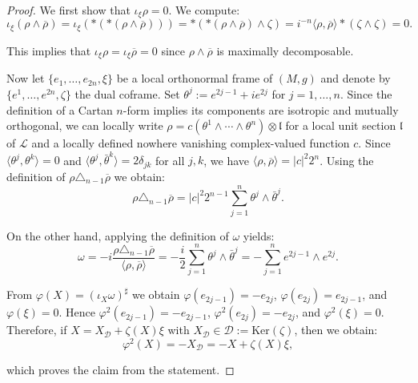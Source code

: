 \documentclass[10pt,a4paper,twoside,reqno]{amsart}
\theoremstyle{plain}
\theoremstyle{definition}
\theoremstyle{remark}
\newcommand{\escal}[1]{\langle#1\rangle}
\renewcommand{\ker}{\mathrm{Ker}}
\begin{document}
\begin{proof}
We first show that $\iota_\xi\rho=0$. We compute:
\begin{equation}\label{eq:contraccion-xi}
\iota_\xi(\rho\wedge\overline{\rho})=\iota_\xi(*(*(\rho\wedge\overline{\rho})))=*(*(\rho\wedge\overline{\rho})\wedge\zeta)=i^{-n}\escal{\rho,\overline{\rho}}*(\zeta\wedge\zeta)=0.
\end{equation}

\noindent
This implies that $\iota_\xi\rho=\iota_\xi\overline{\rho}=0$ since $\rho\wedge\overline{\rho}$ is maximally decomposable.\medskip

Now let $\{e_1,\ldots,e_{2n},\xi\}$ be a local orthonormal frame of $(M,g)$ and denote by $\{e^1,\ldots,e^{2n},\zeta\}$ the dual coframe. Set $\theta^j:=e^{2j-1}+ie^{2j}$ for $j=1,\ldots,n$. Since the definition of a Cartan $n$-form implies its components are isotropic and mutually orthogonal, we can locally write $\rho=c(\theta^1 \wedge \cdots \wedge \theta^n)\otimes\mathfrak{l}$ for a local unit section $\mathfrak{l}$ of $\mathcal{L}$ and a locally defined nowhere vanishing complex-valued function $c$. Since $\escal{\theta^j,\theta^k}=0$ and $\escal{\theta^j,\bar{\theta}^k}=2\delta_{jk}$ for all $j,k$, we have $\escal{\rho,\overline{\rho}}=|c|^2 2^n$. Using the definition of $\rho \triangle_{n-1}\overline{\rho}$ we obtain:
\begin{equation*}
\rho\triangle_{n-1}\overline{\rho}=|c|^2 2^{n-1}\sum_{j=1}^n\theta^j\wedge\bar{\theta}^j.
\end{equation*}

\noindent
On the other hand, applying the definition of $\omega$ yields:
\begin{equation*}
\omega=-i\frac{\rho\triangle_{n-1}\overline{\rho}}{\escal{\rho,\overline{\rho}}}=-\frac{i}{2}\sum_{j=1}^n\theta^j\wedge\bar{\theta}^j=-\sum_{j=1}^n e^{2j-1}\wedge e^{2j}.
\end{equation*}

\noindent
From $\varphi(X)=(\iota_X\omega)^\sharp$ we obtain $\varphi(e_{2j-1})=-e_{2j}$, $\varphi(e_{2j})=e_{2j-1}$, and $\varphi(\xi)=0$. Hence $\varphi^2(e_{2j-1})=-e_{2j-1}$, $\varphi^2(e_{2j})=-e_{2j}$, and $\varphi^2(\xi)=0$. Therefore, if $X=X_{\mathcal{D}}+\zeta(X)\xi$ with $X_{\mathcal{D}}\in\mathcal{D}:=\ker(\zeta)$, then we obtain:
\begin{equation*}
\varphi^2(X)=-X_{\mathcal{D}}=-X+\zeta(X)\xi,
\end{equation*}

\noindent
which proves the claim from the statement.
\end{proof}
\end{document}
